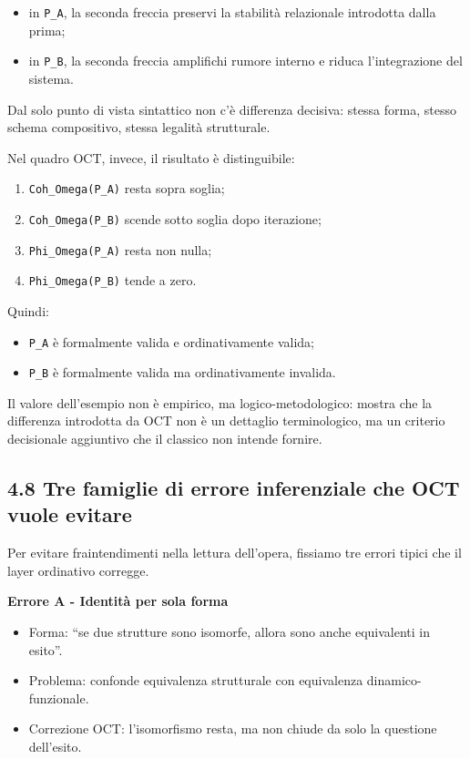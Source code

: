 \begin{itemize}
\tightlist
\item
  in \texttt{P\_A}, la seconda freccia preservi la stabilità relazionale introdotta dalla prima;
\item
  in \texttt{P\_B}, la seconda freccia amplifichi rumore interno e riduca l'integrazione del sistema.
\end{itemize}

Dal solo punto di vista sintattico non c'è differenza decisiva: stessa forma, stesso schema compositivo, stessa legalità strutturale.

Nel quadro OCT, invece, il risultato è distinguibile:

\begin{enumerate}
\def\labelenumi{\arabic{enumi}.}
\tightlist
\item
  \texttt{Coh\_Omega(P\_A)} resta sopra soglia;
\item
  \texttt{Coh\_Omega(P\_B)} scende sotto soglia dopo iterazione;
\item
  \texttt{Phi\_Omega(P\_A)} resta non nulla;
\item
  \texttt{Phi\_Omega(P\_B)} tende a zero.
\end{enumerate}

Quindi:

\begin{itemize}
\tightlist
\item
  \texttt{P\_A} è formalmente valida e ordinativamente valida;
\item
  \texttt{P\_B} è formalmente valida ma ordinativamente invalida.
\end{itemize}

Il valore dell'esempio non è empirico, ma logico-metodologico: mostra che la differenza introdotta da OCT non è un dettaglio terminologico, ma un criterio decisionale aggiuntivo che il classico non intende fornire.

\subsection{4.8 Tre famiglie di errore inferenziale che OCT vuole evitare}

Per evitare fraintendimenti nella lettura dell'opera, fissiamo tre errori tipici che il layer ordinativo corregge.

\textbf{Errore A - Identità per sola forma}

\begin{itemize}
\tightlist
\item
  Forma: ``se due strutture sono isomorfe, allora sono anche equivalenti in esito''.
\item
  Problema: confonde equivalenza strutturale con equivalenza dinamico-funzionale.
\item
  Correzione OCT: l'isomorfismo resta, ma non chiude da solo la questione dell'esito.
\end{itemize}

